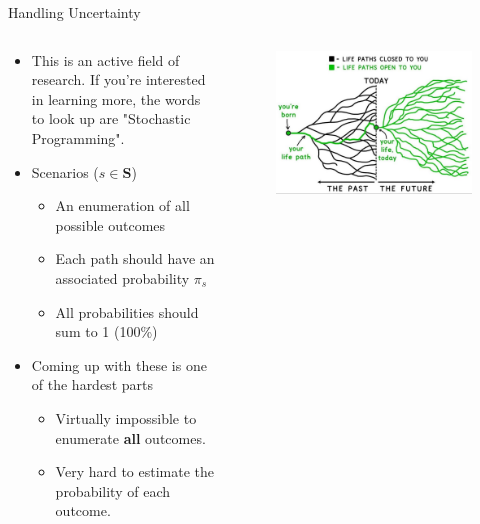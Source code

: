 \documentclass[10pt, aspectratio=169]{beamer}
\begin{document}
\begin{frame}{Handling Uncertainty}
    \begin{columns}
        \begin{column}{0.5\textwidth}
            \begin{itemize}
                \item This is an active field of research. If you're interested in learning more, the words to look up are "Stochastic Programming".
                \item Scenarios ($s \in \textbf{S}$)
                \begin{itemize}
                    \item An enumeration of all possible outcomes
                    \item Each path should have an associated probability $\pi_s$
                    \item All probabilities should sum to 1 (100\%)
                \end{itemize}
                \item Coming up with these is one of the hardest parts
                \begin{itemize}
                    \item Virtually impossible to enumerate \textbf{all} outcomes.
                    \item Very hard to estimate the probability of each outcome.
                \end{itemize}
            \end{itemize}
        \end{column}
        \begin{column}{0.5\textwidth}
            \begin{figure}
                \includegraphics[width=\linewidth]{StochasticTree.jpg}
            \end{figure}
        \end{column}
    \end{columns}
\end{frame}
\end{document}

